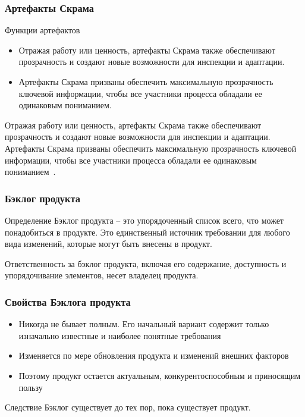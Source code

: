 \documentclass{../industrial-development}
\begin{document}
\begin{frame} \frametitle{{Артефакты Скрама}}
\begin {block} {Функции артефактов} 
\begin{itemize}
\item Отражая работу или ценность, артефакты Скрама также обеспечивают \alert{прозрачность} и
создают новые возможности для \alert{инспекции} и \alert{адаптации}. 
\item Артефакты Скрама призваны
обеспечить максимальную прозрачность ключевой информации, чтобы все участники
процесса обладали ее одинаковым пониманием.
\end{itemize}
\end{block} 
\end {frame} 

\lecturenotes
Отражая работу или ценность, артефакты Скрама также обеспечивают прозрачность и
создают новые возможности для инспекции и адаптации. Артефакты Скрама призваны
обеспечить максимальную прозрачность ключевой информации, чтобы все участники
процесса обладали ее одинаковым пониманием~\cite{Scrum}.

\begin{frame} \frametitle {Бэклог продукта} 
\begin {block} {Определение}
\alert{Бэклог продукта} – это упорядоченный список всего, что может понадобиться в продукте.
Это единственный источник требовании для любого вида изменений, которые могут быть
внесены в продукт. 
\end{block} 
Ответственность за бэклог продукта, включая его содержание,
доступность и упорядочивание элементов, несет \alert{владелец продукта}.
\end {frame}
 


\begin{frame} \frametitle {Свойства Бэклога продукта} 
\begin{itemize}
\item Никогда не бывает \alert{полным}. Его начальный вариант содержит только
изначально известные и наиболее понятные требования

\item Изменяется по мере обновления продукта и
изменений внешних факторов 

\item Поэтому продукт остается \alert{актуальным,
конкурентоспособным и приносящим пользу}
\end{itemize}
\begin{block}{Следствие} Бэклог существует до тех пор, пока существует продукт.
\end{block} 
\end {frame} 
\end{document}
